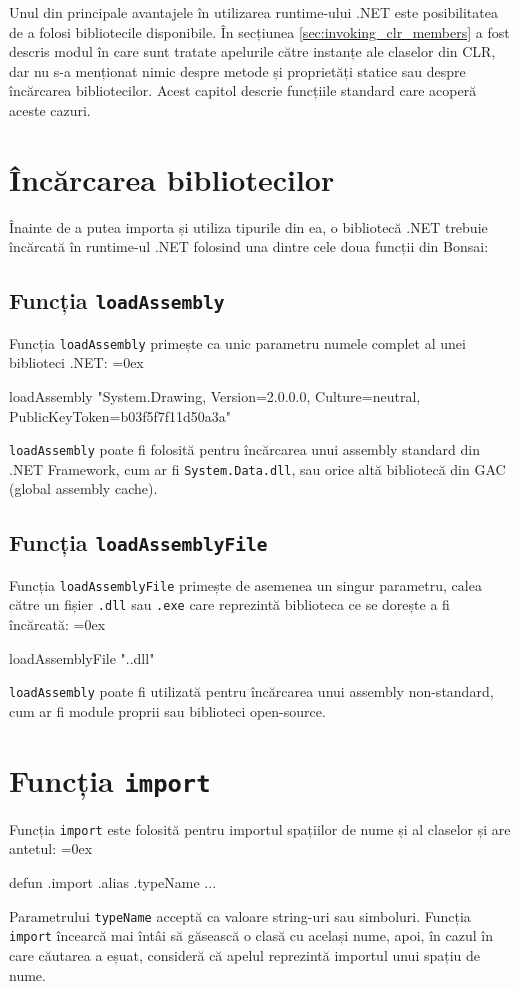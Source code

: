 \documentclass[12pt,a4paper]{memoir}
\renewcommand{\c}{\texttt}
\newenvironment{code}
{
\definecolor{shadecolor}{gray}{0.91}
\topsep=0ex
\relax
\shaded
\verbatim
}
{
\endverbatim
\endshaded
}
\begin{document}
Unul din principale avantajele în utilizarea runtime-ului .NET este posibilitatea de a folosi bibliotecile disponibile. În secțiunea \ref{sec:invoking_clr_members} a fost descris modul în care sunt tratate apelurile către instanțe ale claselor din CLR, dar nu s-a menționat nimic despre metode și proprietăți statice sau despre încărcarea bibliotecilor. Acest capitol descrie funcțiile standard care acoperă aceste cazuri.

\section{Încărcarea bibliotecilor}

Înainte de a putea importa și utiliza tipurile din ea, o bibliotecă .NET trebuie încărcată în runtime-ul .NET folosind una dintre cele doua funcții din Bonsai:

\subsection{Funcția \c{loadAssembly}}

Funcția \c{loadAssembly} primește ca unic parametru numele complet al unei biblioteci .NET:
\begin{code}
loadAssembly "System.Drawing, Version=2.0.0.0, Culture=neutral, 
              PublicKeyToken=b03f5f7f11d50a3a"
\end{code}
\c{loadAssembly} poate fi folosită pentru încărcarea unui assembly standard din .NET Framework, cum ar fi \c{System.Data.dll}, sau orice altă bibliotecă din GAC (global assembly cache).

\subsection{Funcția \c{loadAssemblyFile}}
Funcția \c{loadAssemblyFile} primește de asemenea un singur parametru, calea către un fișier \c{.dll} sau \c{.exe} care reprezintă biblioteca ce se dorește a fi încărcată:
\begin{code}
loadAssemblyFile ".\Lib\MyLibrary.dll"
\end{code}
\c{loadAssembly} poate fi utilizată pentru încărcarea unui assembly non-standard, cum ar fi module proprii sau biblioteci open-source.

\section{Funcția \c{import}}

Funcția \c{import} este folosită pentru importul spațiilor de nume și al claselor și are antetul:
\begin{code}
defun .import .alias .typeName { ... }
\end{code}
Parametrului \c{typeName} acceptă ca valoare string-uri sau simboluri. Funcția \c{import} încearcă mai întâi să găsească o clasă cu același nume, apoi, în cazul în care căutarea a eșuat, consideră că apelul reprezintă importul unui spațiu de nume.
\end{document}
